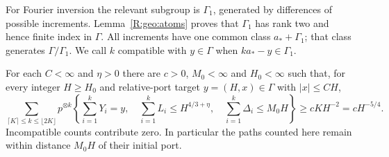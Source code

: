 For Fourier inversion the relevant subgroup is $\Gamma_1$, generated by differences of possible increments. Lemma~\ref{R:geo:atoms} proves that $\Gamma_1$ has rank two and hence finite index in $\Gamma$. All increments have one common class $a_*+\Gamma_1$; that class generates $\Gamma/\Gamma_1$. We call $k$ compatible with $y\in\Gamma$ when $ka_*-y\in\Gamma_1$.

\begin{proposition}
\label{R:resp:point-local}
For each $C<\infty$ and $\eta>0$ there are $c>0$, $M_0<\infty$ and $H_0<\infty$ such that, for every integer $H\ge H_0$ and relative-port target $y=(H,x)\in\Gamma$ with $|x|\le CH$,
\begin{equation}
 \sum_{\lceil K\rceil\le k\le\lfloor2K\rfloor}
 p^{\otimes k}\left\{
 \sum_{i=1}^kY_i=y,\quad
 \sum_{i=1}^kL_i\le H^{4/3+\eta},\quad
 \sum_{i=1}^k\Delta_i\le M_0H
 \right\}
 \ge c K H^{-2}=cH^{-5/4}.
 \label{R:resp:point-bound}
\end{equation}
Incompatible counts contribute zero. In particular the paths counted here remain within distance $M_0H$ of their initial port.
\end{proposition}

